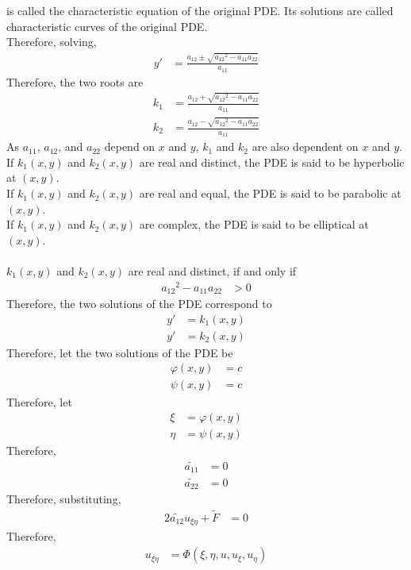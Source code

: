 \documentclass[titlepage, fleqn, a4paper, 12pt, twoside]{article}
\theoremstyle{definition}
\theoremstyle{theorem}
\renewcommand{\tilde}{\widetilde}
\begin{document}
is called the characteristic equation of the original PDE.
Its solutions are called characteristic curves of the original PDE.\\
Therefore, solving,
\begin{align*}
	y' & = \frac{a_{1 2} \pm \sqrt{{a_{1 2}}^2 - a_{1 1} a_{2 2}}}{a_{1 1}}
\end{align*}
Therefore, the two roots are
\begin{align*}
	k_1 & = \frac{a_{1 2} + \sqrt{{a_{1 2}}^2 - a_{1 1} a_{2 2}}}{a_{1 1}} \\
	k_2 & = \frac{a_{1 2} - \sqrt{{a_{1 2}}^2 - a_{1 1} a_{2 2}}}{a_{1 1}}
\end{align*}
As $a_{1 1}$, $a_{1 2}$, and $a_{2 2}$ depend on $x$ and $y$, $k_1$ and $k_2$ are also dependent on $x$ and $y$.\\
If $k_1(x,y)$ and $k_2(x,y)$ are real and distinct, the PDE is said to be hyperbolic at $(x,y)$.\\
If $k_1(x,y)$ and $k_2(x,y)$ are real and equal, the PDE is said to be parabolic at $(x,y)$.\\
If $k_1(x,y)$ and $k_2(x,y)$ are complex, the PDE is said to be elliptical at $(x,y)$.\\
~\\
$k_1(x,y)$ and $k_2(x,y)$ are real and distinct, if and only if
\begin{align*}
	{a_{1 2}}^2 - a_{1 1} a_{2 2} & > 0
\end{align*}
Therefore, the two solutions of the PDE correspond to 
\begin{align*}
	y' & = k_1(x,y) \\
	y' & = k_2(x,y)
\end{align*}
Therefore, let the two solutions of the PDE be
\begin{align*}
	\varphi(x,y) & = c \\
	\psi(x,y)    & = c
\end{align*}
Therefore, let
\begin{align*}
	\xi  & = \varphi(x,y) \\
	\eta & = \psi(x,y)
\end{align*}
Therefore,
\begin{align*}
	\tilde{a_{1 1}} & = 0 \\
	\tilde{a_{2 2}} & = 0
\end{align*}
Therefore, substituting,
\begin{align*}
	2 \tilde{a_{1 2}} u_{\xi \eta} + \tilde{F} & = 0
\end{align*}
Therefore,
\begin{align*}
	u_{\xi \eta} & = \Phi(\xi,\eta,u,u_{\xi},u_{\eta})
\end{align*}
\end{document}
